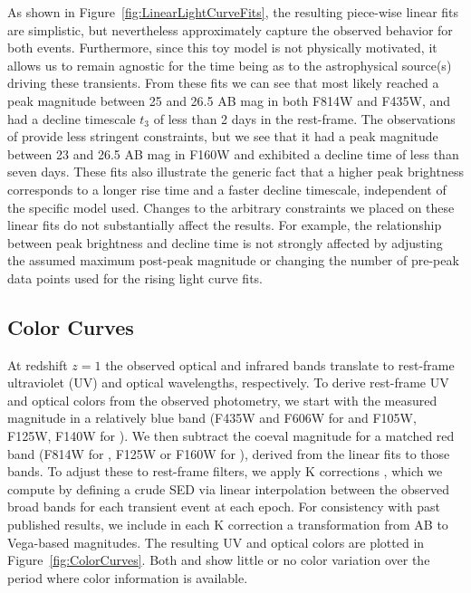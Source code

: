 As shown in Figure~\ref{fig:LinearLightCurveFits}, the resulting
piece-wise linear fits are simplistic, but nevertheless approximately
capture the observed behavior for both events.  Furthermore, since
this toy model is not physically motivated, it allows us to remain
agnostic for the time being as to the astrophysical source(s) driving
these transients.  From these fits we can see that \spockone most
likely reached a peak magnitude between 25 and 26.5 AB mag in both
F814W and F435W, and had a decline timescale $t_3$ of less than 2 days
in the rest-frame. The observations of \spocktwo provide less
stringent constraints, but we see that it had a peak magnitude between
23 and 26.5 AB mag in F160W and exhibited a decline time of less than
seven days.  These fits also illustrate the generic fact that a higher
peak brightness corresponds to a longer rise time and a faster decline
timescale, independent of the specific model used.  Changes to the
arbitrary constraints we placed on these linear fits do not
substantially affect the results.  For example, the relationship
between peak brightness and decline time is not strongly affected by
adjusting the assumed maximum post-peak magnitude or changing the
number of pre-peak data points used for the rising light curve fits.


\subsection{Color Curves}

At redshift $z=1$ the observed optical and infrared bands translate to
rest-frame ultraviolet (UV) and optical wavelengths, respectively.  To
derive rest-frame UV and optical colors from the observed photometry,
we start with the measured magnitude in a relatively blue band (F435W
and F606W for \spockone and F105W, F125W, F140W for \spocktwo).  We
then subtract the coeval magnitude for a matched red band (F814W for
\spockone, F125W or F160W for \spocktwo), derived from the linear fits
to those bands.  To adjust these to rest-frame filters, we apply K
corrections \citep[following][]{Hogg:2002}, which we compute by
defining a crude SED via linear interpolation between the observed
broad bands for each transient event at each epoch.  For consistency
with past published results, we include in each K correction a
transformation from AB to Vega-based magnitudes.  The resulting UV and
optical colors are plotted in Figure~\ref{fig:ColorCurves}.  Both
\spockone and \spocktwo show little or no color variation over the
period where color information is available.  

